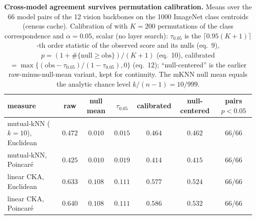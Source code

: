 \begin{table}[H]
\centering
\footnotesize
\setlength{\tabcolsep}{3pt}
\begin{tabular}{lcccccc}
\toprule
measure & raw & null mean & $\tau_{0.05}$ & calibrated & null-centered & pairs $p<0.05$ \\
\midrule
mutual-kNN ($k{=}10$), Euclidean & $0.472$ & $0.010$ & $0.015$ & $0.464$ & $0.462$ & 66/66 \\
mutual-kNN, Poincar\'e & $0.425$ & $0.010$ & $0.019$ & $0.414$ & $0.415$ & 66/66 \\
linear CKA, Euclidean & $0.633$ & $0.108$ & $0.111$ & $0.577$ & $0.524$ & 66/66 \\
linear CKA, Poincar\'e & $0.640$ & $0.108$ & $0.111$ & $0.586$ & $0.532$ & 66/66 \\
\bottomrule
\end{tabular}
\par\vspace{5pt}
\caption{\textbf{Cross-model agreement survives permutation calibration.} Means over the 66 model pairs of the 12 vision backbones on the 1000 ImageNet class centroids (census cache). Calibration of \citet{groger2026aristotelian} with $K{=}200$ permutations of the class correspondence and $\alpha{=}0.05$, scalar (no layer search): $\tau_{0.05}$ is the $\lceil0.95(K{+}1)\rceil$-th order statistic of the observed score and its nulls (eq.\ 9), $p=(1+\#\{\text{null}\ge\text{obs}\})/(K{+}1)$ (eq.\ 10), calibrated $=\max\{(\text{obs}-\tau_{0.05})/(1-\tau_{0.05}),0\}$ (eq.\ 12); ``null-centered'' is the earlier raw-minus-null-mean variant, kept for continuity. The mKNN null mean equals the analytic chance level $k/(n{-}1)=10/999$. %
}
\label{tab:q13-local}
\end{table}
